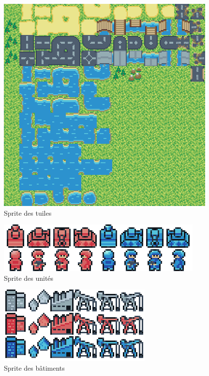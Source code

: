 \begin{figure}[h]
    \centering
    \includegraphics[scale = 1]{images/mapTileset.png}
    \caption{Sprite des tuiles}
    \label{fig:Advance Wars}
\end{figure}

\begin{figure}[h]
    \centering
    \includegraphics[scale = 1]{images/units.png}
    \caption{Sprite des unités}
    \label{fig:Advance Wars}
\end{figure}

\begin{figure}[h]
    \centering
    \includegraphics[scale = 1]{images/buildings.png}
    \caption{Sprite des bâtiments}
    \label{fig:Advance Wars}
\end{figure}

\newpage